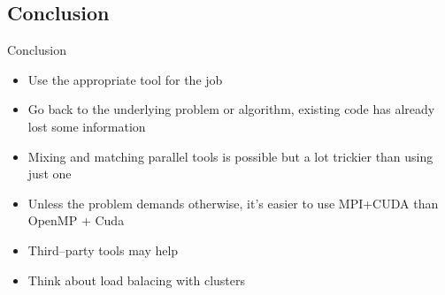 \documentclass{beamer}
\newcounter{lp}
\begin{document}
\subsection{Conclusion}

\begin{frame}{Conclusion}

  \begin{itemize}
  \item Use the appropriate tool for the job
  \item Go back to the underlying problem or algorithm, existing code
    has already lost some information
  \item Mixing and matching parallel tools is possible but a lot trickier
    than using just one
  \item Unless the problem demands otherwise, it's easier to use MPI+CUDA
    than OpenMP + Cuda
  \item Third--party tools may help
  \item Think about load balacing with clusters
  \end{itemize}
\end{frame}
\end{document}
